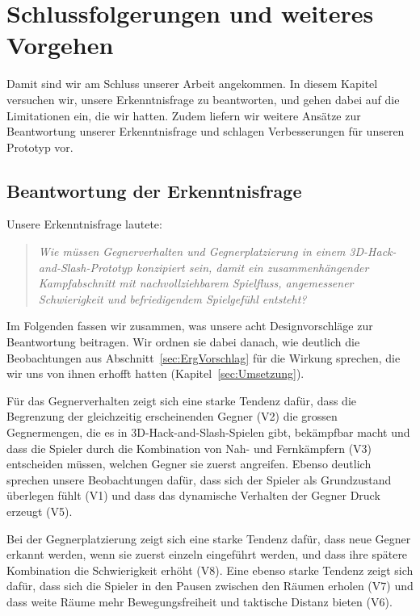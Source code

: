 \documentclass[../Main.tex]{subfiles}
\begin{document}
\section{Schlussfolgerungen und weiteres Vorgehen} \label{sec:Schlussfolgerungen}

Damit sind wir am Schluss unserer Arbeit angekommen. In diesem Kapitel versuchen wir, unsere Erkenntnisfrage zu beantworten, und gehen dabei auf die Limitationen ein, die wir hatten. Zudem liefern wir weitere Ansätze zur Beantwortung unserer Erkenntnisfrage und schlagen Verbesserungen für unseren Prototyp vor.

\subsection{Beantwortung der Erkenntnisfrage} \label{sec:Beantwortung}

Unsere Erkenntnisfrage lautete:

\begin{quote}
    \textit{Wie müssen Gegnerverhalten und Gegnerplatzierung in einem 3D-Hack-and-Slash-Prototyp konzipiert sein, damit ein zusammenhängender Kampfabschnitt mit nachvollziehbarem Spielfluss, angemessener Schwierigkeit und befriedigendem Spielgefühl entsteht?}
\end{quote}

Im Folgenden fassen wir zusammen, was unsere acht Designvorschläge zur Beantwortung beitragen. Wir ordnen sie dabei danach, wie deutlich die Beobachtungen aus Abschnitt~\ref{sec:ErgVorschlag} für die Wirkung sprechen, die wir uns von ihnen erhofft hatten (Kapitel~\ref{sec:Umsetzung}).

Für das Gegnerverhalten zeigt sich eine starke Tendenz dafür, dass die Begrenzung der gleichzeitig erscheinenden Gegner (V2) die grossen Gegnermengen, die es in 3D-Hack-and-Slash-Spielen gibt, bekämpfbar macht und dass die Spieler durch die Kombination von Nah- und Fernkämpfern (V3) entscheiden müssen, welchen Gegner sie zuerst angreifen. Ebenso deutlich sprechen unsere Beobachtungen dafür, dass sich der Spieler als Grundzustand überlegen fühlt (V1) und dass das dynamische Verhalten der Gegner Druck erzeugt (V5).

Bei der Gegnerplatzierung zeigt sich eine starke Tendenz dafür, dass neue Gegner erkannt werden, wenn sie zuerst einzeln eingeführt werden, und dass ihre spätere Kombination die Schwierigkeit erhöht (V8). Eine ebenso starke Tendenz zeigt sich dafür, dass sich die Spieler in den Pausen zwischen den Räumen erholen (V7) und dass weite Räume mehr Bewegungsfreiheit und taktische Distanz bieten (V6).
\end{document}
